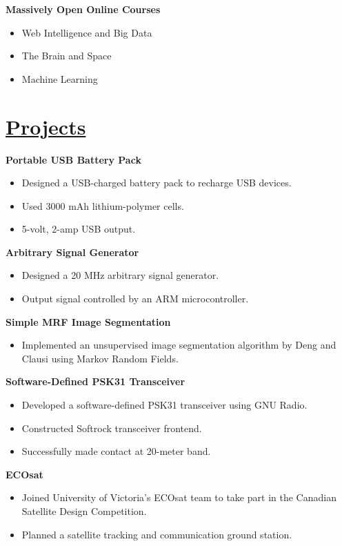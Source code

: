 \documentclass[a4paper, 11pt]{article}
\begin{document}
  \textbf{Massively Open Online Courses}
  \begin{itemize}[nosep]
    \item Web Intelligence and Big Data
    \item The Brain and Space
    \item Machine Learning
  \end{itemize}
  
\section{\underline{Projects}}
  \textbf{Portable USB Battery Pack}
  \begin{itemize}[nosep]
    \item Designed a USB-charged battery pack to recharge USB devices.
    \item Used 3000 mAh lithium-polymer cells.
    \item 5-volt, 2-amp USB output.
  \end{itemize}
  \medskip

  \textbf{Arbitrary Signal Generator}  
  \begin{itemize}[nosep]
    \item Designed a 20 MHz arbitrary signal generator.
    \item Output signal controlled by an ARM microcontroller.    
  \end{itemize}
  \medskip
  
  \textbf{Simple MRF Image Segmentation}
  \begin{itemize}[nosep]
    \item Implemented an unsupervised image segmentation algorithm by Deng and Clausi using Markov Random Fields.
  \end{itemize}
  \medskip

  \textbf{Software-Defined PSK31 Transceiver}
  \begin{itemize}[nosep]
    \item Developed a software-defined PSK31 transceiver using GNU Radio.
    \item Constructed Softrock transceiver frontend.
    \item Successfully made contact at 20-meter band.
  \end{itemize}
  \medskip
  
  \textbf{ECOsat}
  \begin{itemize}[nosep]
    \item Joined University of Victoria's ECOsat team to take part in the Canadian Satellite Design Competition.
    \item Planned a satellite tracking and communication ground station.
  \end{itemize}
  
\end{document}
